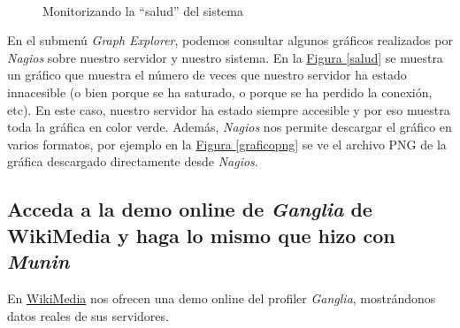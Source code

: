 \documentclass[10pt,a4paper,spanish]{article}
\numberwithin{equation}{section} %
\numberwithin{figure}{section} %
\numberwithin{table}{section} %
\begin{document}
\begin{figure}[!h]
\centering
\mbox {
\qquad
{}
}
\caption{Monitorizando la ``salud'' del sistema}
\label{health}
\end{figure}

En el submenú \textit{Graph Explorer}, podemos consultar algunos gráficos realizados por \textit{Nagios} sobre nuestro servidor y nuestro sistema. En la \hyperref[salud]{Figura \ref*{salud}} se muestra un gráfico que muestra el número de veces que nuestro servidor ha estado innacesible (o bien porque se ha saturado, o porque se ha perdido la conexión, etc). En este caso, nuestro servidor ha estado siempre accesible y por eso muestra toda la gráfica en color verde. Además, \textit{Nagios} nos permite descargar el gráfico en varios formatos, por ejemplo en la \hyperref[graficopng]{Figura \ref*{graficopng}} se ve el archivo PNG de la gráfica descargado directamente desde \textit{Nagios}.

\subsection{Acceda a la demo online de \textit{Ganglia} de WikiMedia y haga lo mismo que hizo con \textit{Munin}}
En \href{http://ganglia.wikimedia.org/latest/}{WikiMedia} nos ofrecen una demo online del profiler \textit{Ganglia}, mostrándonos datos reales de sus servidores.
\end{document}
